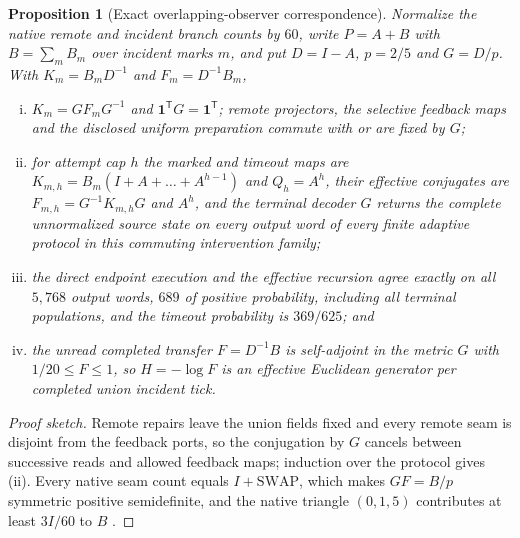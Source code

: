 \documentclass[11pt]{article}
\newtheorem{proposition}[theorem]{Proposition}
\theoremstyle{definition}
\theoremstyle{remark}
\theoremstyle{plain}
\begin{document}
\begin{proposition}[Exact overlapping-observer correspondence]
\label{prop:correspondence}
Normalize the native remote and incident branch counts by $60$, write
$P=A+B$ with $B=\sum_mB_m$ over incident marks $m$, and put $D=I-A$,
$p=2/5$ and $G=D/p$. With $K_m=B_mD^{-1}$ and $F_m=D^{-1}B_m$,
\begin{enumerate}[(i)]
\item $K_m=GF_mG^{-1}$ and $\mathbf 1^{\mathsf T}G=\mathbf 1^{\mathsf T}$; remote
projectors, the selective feedback maps and the disclosed uniform
preparation commute with or are fixed by $G$;
\item for attempt cap $h$ the marked and timeout maps are
$K_{m,h}=B_m(I+A+\dots+A^{h-1})$ and $Q_h=A^h$, their effective conjugates
are $F_{m,h}=G^{-1}K_{m,h}G$ and $A^h$, and the terminal decoder $G$
returns the complete unnormalized source state on every output word of
every finite adaptive protocol in this commuting intervention family;
\item the direct endpoint execution and the effective recursion agree
exactly on all $5{,}768$ output words, $689$ of positive probability,
including all terminal populations, and the timeout probability is
$369/625$; and
\item the unread completed transfer $F=D^{-1}B$ is self-adjoint in the
metric $G$ with $1/20\le F\le1$, so $H=-\log F$ is an effective Euclidean
generator per completed union incident tick.
\end{enumerate}
\end{proposition}

\begin{proof}[Proof sketch]
Remote repairs leave the union fields fixed and every remote seam is
disjoint from the feedback ports, so the conjugation by $G$ cancels between
successive reads and allowed feedback maps; induction over the protocol
gives (ii). Every native seam count equals $I+\mathrm{SWAP}$, which makes
$GF=B/p$ symmetric positive semidefinite, and the native triangle $(0,1,5)$
contributes at least $3I/60$ to $B$ \cite{nativeCorrespondence}.
\end{proof}
\end{document}
